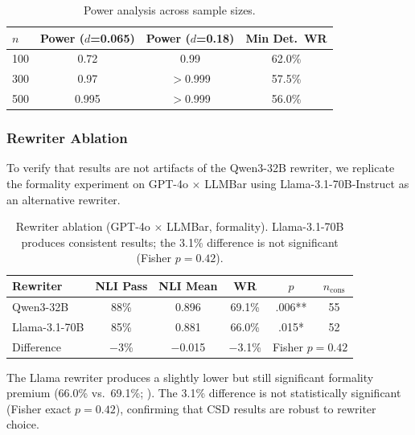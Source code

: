 \documentclass[11pt,a4paper]{article}
\begin{document}
\begin{table}[t]
\centering
\small
\caption{Power analysis across sample sizes.}
\label{tab:power}
\begin{tabular}{lccc}
\toprule
$n$ & \textbf{Power ($d$=0.065)} & \textbf{Power ($d$=0.18)} & \textbf{Min Det.\ WR} \\
\midrule
100 & 0.72  & 0.99    & 62.0\% \\
300 & 0.97  & $>$0.999 & 57.5\% \\
500 & 0.995 & $>$0.999 & 56.0\% \\
\bottomrule
\end{tabular}
\end{table}

\subsubsection{Rewriter Ablation}
\label{sec:rewriter}

To verify that results are not artifacts of the Qwen3-32B rewriter, we replicate the formality experiment on GPT-4o $\times$ LLMBar using Llama-3.1-70B-Instruct as an alternative rewriter.

\begin{table}[t]
\centering
\small
\caption{Rewriter ablation (GPT-4o $\times$ LLMBar, formality). Llama-3.1-70B produces consistent results; the 3.1\% difference is not significant (Fisher $p=0.42$).}
\label{tab:rewriter}
\begin{tabular}{lccccc}
\toprule
\textbf{Rewriter} & \textbf{NLI Pass} & \textbf{NLI Mean} & \textbf{WR} & $p$ & $n_\text{cons}$ \\
\midrule
Qwen3-32B       & 88\% & 0.896 & 69.1\% & .006** & 55 \\
Llama-3.1-70B   & 85\% & 0.881 & 66.0\% & .015*  & 52 \\
\midrule
Difference       & $-$3\% & $-$0.015 & $-$3.1\% & \multicolumn{2}{c}{Fisher $p=0.42$} \\
\bottomrule
\end{tabular}
\end{table}

The Llama rewriter produces a slightly lower but still significant formality premium (66.0\% vs.\ 69.1\%; ).
The 3.1\% difference is not statistically significant (Fisher exact $p = 0.42$), confirming that CSD results are robust to rewriter choice.

\end{document}
